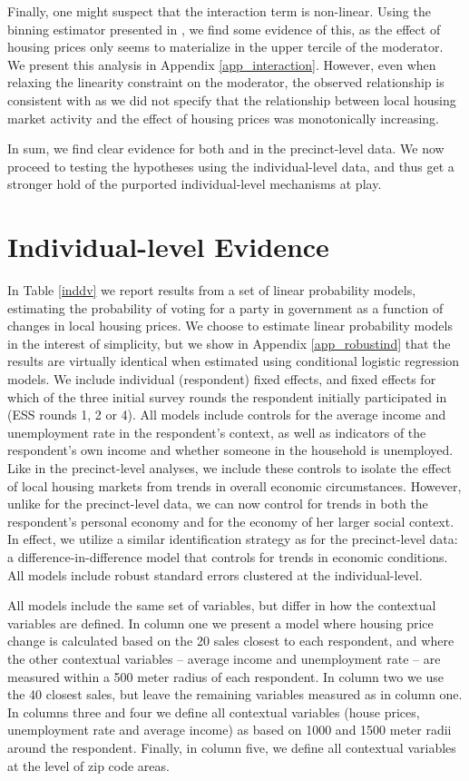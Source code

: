 \documentclass[12pt,a4paper]{article}
\begin{document}
	Finally, one might suspect that the interaction term is non-linear. Using the binning estimator presented in \cite{hainmueller2016much}, we find some evidence of this, as the effect of housing prices only seems to materialize in the upper tercile of the moderator. We present this analysis in Appendix \ref{app_interaction}. However, even when relaxing the linearity constraint on the moderator, the observed relationship is consistent with \htwo as we did not specify that the relationship between local housing market activity and the effect of housing prices was monotonically increasing. 
	
	
	In sum, we find clear evidence for both \hone and \htwo in the precinct-level data. We now proceed to testing the hypotheses using the individual-level data, and thus get a stronger hold of the purported individual-level mechanisms at play.
	
	\section{Individual-level Evidence}
	
	In Table \ref{inddv} we report results from a set of linear probability models, estimating the probability of voting for a party in government as a function of changes in local housing prices. We choose to estimate linear probability models in the interest of simplicity, but we show in Appendix \ref{app_robustind} that the results are virtually identical when estimated using conditional logistic regression models. We include individual (respondent) fixed effects, and fixed effects for which of the three initial survey rounds the respondent initially participated in (ESS rounds 1, 2 or 4). All models include controls for the average income and unemployment rate in the respondent's context, as well as indicators of the respondent's own income and whether someone in the household is unemployed. Like in the precinct-level analyses, we include these controls to isolate the effect of local housing markets from trends in overall economic circumstances. However, unlike for the precinct-level data, we can now control for trends in both the respondent’s personal economy and for the economy of her larger social context. In effect, we utilize a similar identification strategy as for the precinct-level data: a difference-in-difference model that controls for trends in economic conditions. All models include robust standard errors clustered at the individual-level.
	
	All models include the same set of variables, but differ in how the contextual variables are defined. In column one we present a model where housing price change is calculated based on the 20 sales closest to each respondent, and where the other contextual variables -- average income and unemployment rate -- are measured within a 500 meter radius of each respondent. In column two we use the 40 closest sales, but leave the remaining variables measured as in column one. In columns three and four we define all contextual variables (house prices, unemployment rate and average income) as based on 1000 and 1500 meter radii around the respondent. Finally, in column five, we define all contextual variables at the level of zip code areas. 
	
\end{document}
